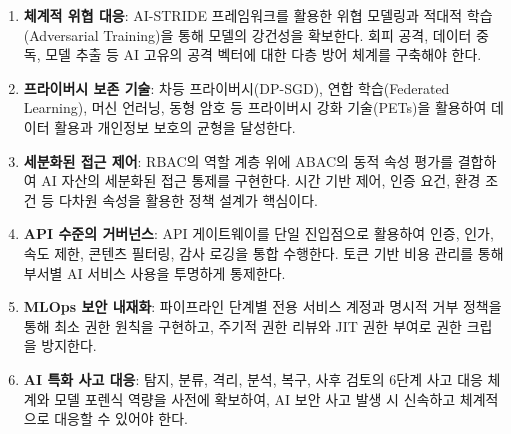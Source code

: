 \begin{enumerate}
    \item \textbf{체계적 위협 대응}: AI-STRIDE 프레임워크를 활용한 위협 모델링과 적대적 학습(Adversarial Training)을 통해 모델의 강건성을 확보한다. 회피 공격, 데이터 중독, 모델 추출 등 AI 고유의 공격 벡터에 대한 다층 방어 체계를 구축해야 한다.
    \item \textbf{프라이버시 보존 기술}: 차등 프라이버시(DP-SGD), 연합 학습(Federated Learning), 머신 언러닝, 동형 암호 등 프라이버시 강화 기술(PETs)을 활용하여 데이터 활용과 개인정보 보호의 균형을 달성한다.
    \item \textbf{세분화된 접근 제어}: RBAC의 역할 계층 위에 ABAC의 동적 속성 평가를 결합하여 AI 자산의 세분화된 접근 통제를 구현한다. 시간 기반 제어, 인증 요건, 환경 조건 등 다차원 속성을 활용한 정책 설계가 핵심이다.
    \item \textbf{API 수준의 거버넌스}: API 게이트웨이를 단일 진입점으로 활용하여 인증, 인가, 속도 제한, 콘텐츠 필터링, 감사 로깅을 통합 수행한다. 토큰 기반 비용 관리를 통해 부서별 AI 서비스 사용을 투명하게 통제한다.
    \item \textbf{MLOps 보안 내재화}: 파이프라인 단계별 전용 서비스 계정과 명시적 거부 정책을 통해 최소 권한 원칙을 구현하고, 주기적 권한 리뷰와 JIT 권한 부여로 권한 크립을 방지한다.
    \item \textbf{AI 특화 사고 대응}: 탐지, 분류, 격리, 분석, 복구, 사후 검토의 6단계 사고 대응 체계와 모델 포렌식 역량을 사전에 확보하여, AI 보안 사고 발생 시 신속하고 체계적으로 대응할 수 있어야 한다.
\end{enumerate}
